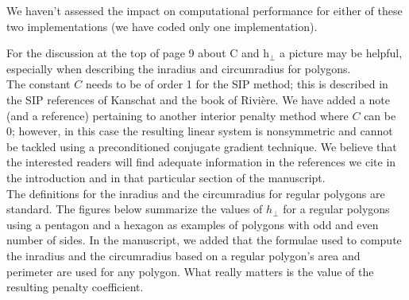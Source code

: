 \documentclass{article}
\begin{document}
We haven't assessed the impact on computational performance for either of these two implementations (we have coded only one implementation).

\bigskip

{
\color{blue}
For the discussion at the top of page 9 about C and h$_\perp$ a picture may be helpful, especially when
describing the inradius and circumradius for polygons.\\
}
The constant $C$ needs to be of order 1 for the SIP method; this is described in the SIP references of Kanschat and the 
book of Rivi\`ere. We have added a note (and a reference) pertaining to another interior penalty method where $C$ can be 0; however,
in this case the resulting linear system is nonsymmetric and cannot be tackled using a preconditioned conjugate gradient technique.
We believe that the interested readers will find adequate information in the references we cite in the introduction and in that 
particular section of the manuscript.\\


The definitions for the inradius and the circumradius for regular polygons are standard.
The figures below summarize the values of $h_\perp$ for a regular polygons using a pentagon and a hexagon as examples of polygons 
with odd and even number of sides. In the manuscript, we added that
the formulae used to compute the inradius and the circumradius based on a regular polygon's area and perimeter
are used for any polygon. What really matters is the value of the resulting penalty coefficient.  
\end{document}

